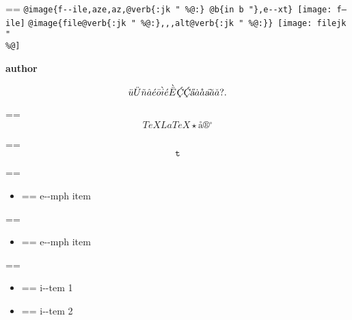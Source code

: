 \documentclass{book}
\makeatletter
\newenvironment{Texinfopreformatted}{%
  \par\GNUTobeylines\obeyspaces\frenchspacing\parskip=\z@\parindent=\z@}{}
{\catcode`\^^M=13 \gdef\GNUTobeylines{\catcode`\^^M=13 \def^^M{\null\par}}}
\newenvironment{Texinfoindented}{\begin{list}{}{}\item\relax}{\end{list}}
\renewcommand{\_}{\Texinfounderscore\discretionary{}{}{}}
\renewcommand{\includegraphics}[1]{\fbox{FIG \detokenize{#1}}}
\makeatother
\begin{document}
\begin{Texinfoindented}
\begin{Texinfopreformatted}
\texttt{@image\{f{-}{-}ile,aze,az,@verb\{:jk \_" \%@:\}\ @b\{in b "\},e{-}{-}xt\}}\ \texttt{[image: f--ile]}
\texttt{@image\{file@verb\{:jk \_" \%@:\}{,}{,},alt@verb\{:jk \_" \%@:\}\}}\ \texttt{[image: filejk \_" \\\%@]}


{\bfseries author}%

\end{Texinfopreformatted}
\[
\ddot{u} \ddot{U} \tilde{n} \hat{a} \acute{e} \bar{o} \grave{i} \acute{e} \grave{\bar{E}}
\textsl{\c{\'{C}}} \textsl{\c{\'{C}}} \textsl{\H{a}} \dot{a} \mathring{a} \textsl{\t{a}}
\breve{a} \check{a}
 ? .
\]
\begin{Texinfopreformatted}%
\ttfamily 
\end{Texinfopreformatted}
\[
TeX LaTeX \star{} \mathord{\text{\aa{}}} \circledR{} ^{\circ{}} 
\]
\begin{Texinfopreformatted}%
\ttfamily 
\end{Texinfopreformatted}
\[
\mathtt{t} 
\]
\begin{Texinfopreformatted}%
\ttfamily 
\end{Texinfopreformatted}
\begin{itemize}[label=\emph{}]
\item \begin{Texinfopreformatted}%
\ttfamily e{-}{-}mph item
\end{Texinfopreformatted}
\end{itemize}
\begin{Texinfopreformatted}%
\ttfamily 
\end{Texinfopreformatted}
\begin{itemize}[label=\emph{} after emph]
\item \begin{Texinfopreformatted}%
\ttfamily e{-}{-}mph item
\end{Texinfopreformatted}
\end{itemize}
\begin{Texinfopreformatted}%
\ttfamily 
\end{Texinfopreformatted}
\begin{itemize}[label=\textbullet{} a--n itemize line]
\item \begin{Texinfopreformatted}%
\ttfamily i{-}{-}tem 1
\end{Texinfopreformatted}
\item \begin{Texinfopreformatted}%
\ttfamily i{-}{-}tem 2
\end{Texinfopreformatted}

\end{itemize}
\end{Texinfoindented}
\end{document}
